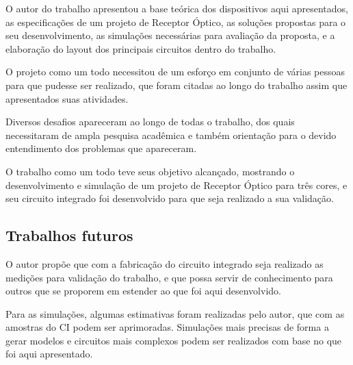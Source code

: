 
O autor do trabalho apresentou a base teórica dos dispositivos aqui apresentados, as especificações de um projeto de Receptor Óptico, as soluções propostas para o seu desenvolvimento, as simulações necessárias para avaliação da proposta, e a elaboração do layout dos principais circuitos dentro do trabalho.

O projeto como um todo necessitou de um esforço em conjunto de várias pessoas para que pudesse ser realizado, que foram citadas ao longo do trabalho assim que apresentados suas atividades.

Diversos desafios apareceram ao longo de todas o trabalho, dos quais necessitaram de ampla pesquisa acadêmica e também orientação para o devido entendimento dos problemas que apareceram.

O trabalho como um todo teve seus objetivo alcançado, mostrando o desenvolvimento e simulação de um projeto de Receptor Óptico para três cores, e seu circuito integrado foi desenvolvido para que seja realizado a sua validação.

\subsection{Trabalhos futuros}

O autor propõe que com a fabricação do circuito integrado seja realizado as medições para validação do trabalho, e que possa servir de conhecimento para outros que se proporem em estender ao que foi aqui desenvolvido.

Para as simulações, algumas estimativas foram realizadas pelo autor, que com as amostras do CI podem ser aprimoradas. Simulações mais precisas de forma a gerar modelos e circuitos mais complexos podem ser realizados com base no que foi aqui apresentado.